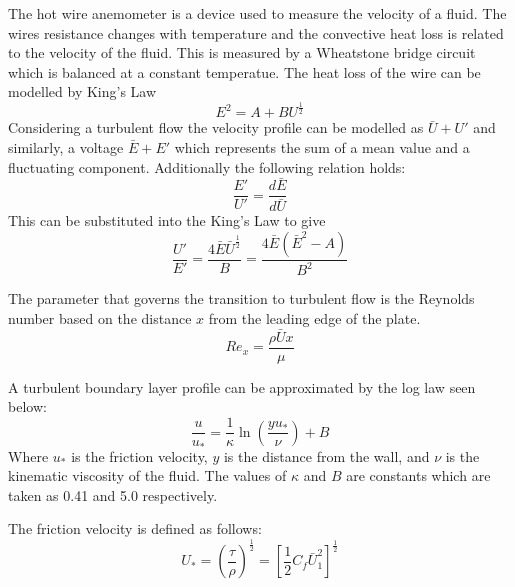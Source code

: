 \documentclass{article}
\begin{document}
The hot wire anemometer is a device used to measure the velocity of a fluid.
The wires resistance changes with temperature and the convective heat loss is related to the velocity of the fluid.
This is measured by a Wheatstone bridge circuit which is balanced at a constant temperatue.
The heat loss of the wire can be modelled by King's Law
\begin{equation}
    E^2 = A + B U^{\frac{1}{2}}
\end{equation}
Considering a turbulent flow the velocity profile can be modelled as $\bar{U} + U'$ and similarly, a voltage $\bar{E} + E'$ which represents the sum of a mean value and a fluctuating component.
Additionally the following relation holds:
\begin{equation}
    \frac{E'}{U'} = \frac{d\bar{E}}{d\bar{U}}
\end{equation}
This can be substituted into the King's Law to give
\begin{equation}
    \frac{U'}{E'} = \frac{4\bar{E}\bar{U}^{\frac{1}{2}}}{B} = \frac{4\bar{E}(\bar{E}^2 - A)}{B^2}
    \label{eq:small_kings}
\end{equation}

The parameter that governs the transition to turbulent flow is the Reynolds number based on the distance $x$ from the leading edge of the plate.
\begin{equation}
    Re_x = \frac{\rho \bar{U}x}{\mu}
\end{equation}

A turbulent boundary layer profile can be approximated by the log law seen below:
\begin{equation}
    \frac{u}{u_*} = \frac{1}{\kappa} \ln \left( \frac{y u_*}{\nu} \right) + B
\end{equation}
Where $u_*$ is the friction velocity, $y$ is the distance from the wall, and $\nu$ is the kinematic viscosity of the fluid.
The values of $\kappa$ and $B$ are constants which are taken as 0.41 and 5.0 respectively.

The friction velocity is defined as follows:
\begin{equation}
    U_* = \left( \frac{\tau}{\rho} \right)^{\frac{1}{2}} = \left[ \frac{1}{2}C_f \bar{ U}_1^2 \right]^{\frac{1}{2}}
    \label{eq:friction_velocity}
\end{equation}



\end{document}
